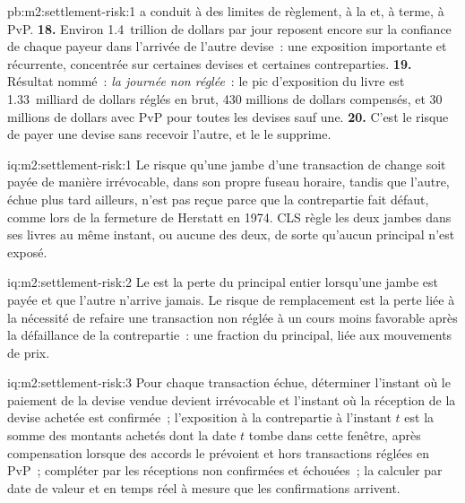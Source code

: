 \begin{solution}{pb:m2:settlement-risk:1}
a conduit à des limites de règlement, à la  et, à terme, à PvP.
\textbf{18.} Environ 1.4~trillion de dollars par jour reposent encore sur la confiance de chaque
payeur dans l'arrivée de l'autre devise~: une exposition importante et récurrente, concentrée
sur certaines devises et certaines contreparties.
\textbf{19.} Résultat nommé~: \emph{la journée non réglée}~: le pic d'exposition du livre est
1.33~milliard de dollars réglés en brut, 430 millions de dollars compensés, et 30 millions de dollars avec PvP
pour toutes les devises sauf une.
\textbf{20.} C'est le risque de payer une devise sans recevoir l'autre, et
le  le supprime.
\end{solution}

\begin{solution}{iq:m2:settlement-risk:1}
Le risque qu'une jambe d'une transaction de change soit payée de manière irrévocable, dans son propre fuseau horaire,
tandis que l'autre, échue plus tard ailleurs, n'est pas reçue parce que la contrepartie
fait défaut, comme lors de la fermeture de Herstatt en 1974. CLS règle les deux jambes dans ses livres au
même instant, ou aucune des deux, de sorte qu'aucun principal n'est exposé.
\end{solution}

\begin{solution}{iq:m2:settlement-risk:2}
Le  est la perte du principal entier lorsqu'une jambe est payée et que
l'autre n'arrive jamais. Le risque de remplacement est la perte liée à la nécessité de refaire une
transaction non réglée à un cours moins favorable après la défaillance de la contrepartie~: une fraction du principal,
liée aux mouvements de prix.
\end{solution}

\begin{solution}{iq:m2:settlement-risk:3}
Pour chaque transaction échue, déterminer l'instant où le paiement de la devise vendue devient irrévocable
et l'instant où la réception de la devise achetée est confirmée~; l'exposition à la
contrepartie à l'instant $t$ est la somme des montants achetés dont la date $t$ tombe dans cette fenêtre,
après compensation lorsque des accords le prévoient et hors transactions réglées en PvP~; compléter par
les réceptions non confirmées et échouées~; la calculer par date de valeur et en temps réel à mesure
que les confirmations arrivent.
\end{solution}

